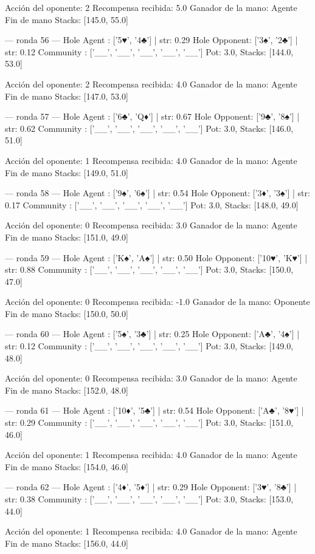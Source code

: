 Acción del oponente: 2
Recompensa recibida: 5.0
Ganador de la mano: Agente
Fin de mano Stacks: [145.0, 55.0]


--- ronda 56 ---
Hole Agent : ['5♥', '4♣'] | str: 0.29
Hole Opponent: ['3♠', '2♣'] | str: 0.12
Community  : ['__', '__', '__', '__', '__']
Pot: 3.0, Stacks: [144.0, 53.0]

Acción del oponente: 2
Recompensa recibida: 4.0
Ganador de la mano: Agente
Fin de mano Stacks: [147.0, 53.0]


--- ronda 57 ---
Hole Agent : ['6♣', 'Q♦'] | str: 0.67
Hole Opponent: ['9♣', '8♠'] | str: 0.62
Community  : ['__', '__', '__', '__', '__']
Pot: 3.0, Stacks: [146.0, 51.0]

Acción del oponente: 1
Recompensa recibida: 4.0
Ganador de la mano: Agente
Fin de mano Stacks: [149.0, 51.0]


--- ronda 58 ---
Hole Agent : ['9♠', '6♠'] | str: 0.54
Hole Opponent: ['3♦', '3♠'] | str: 0.17
Community  : ['__', '__', '__', '__', '__']
Pot: 3.0, Stacks: [148.0, 49.0]

Acción del oponente: 0
Recompensa recibida: 3.0
Ganador de la mano: Agente
Fin de mano Stacks: [151.0, 49.0]


--- ronda 59 ---
Hole Agent : ['K♠', 'A♠'] | str: 0.50
Hole Opponent: ['10♥', 'K♥'] | str: 0.88
Community  : ['__', '__', '__', '__', '__']
Pot: 3.0, Stacks: [150.0, 47.0]

Acción del oponente: 0
Recompensa recibida: -1.0
Ganador de la mano: Oponente
Fin de mano Stacks: [150.0, 50.0]


--- ronda 60 ---
Hole Agent : ['5♠', '3♣'] | str: 0.25
Hole Opponent: ['A♣', '4♠'] | str: 0.12
Community  : ['__', '__', '__', '__', '__']
Pot: 3.0, Stacks: [149.0, 48.0]

Acción del oponente: 0
Recompensa recibida: 3.0
Ganador de la mano: Agente
Fin de mano Stacks: [152.0, 48.0]


--- ronda 61 ---
Hole Agent : ['10♦', '5♣'] | str: 0.54
Hole Opponent: ['A♣', '8♥'] | str: 0.29
Community  : ['__', '__', '__', '__', '__']
Pot: 3.0, Stacks: [151.0, 46.0]

Acción del oponente: 1
Recompensa recibida: 4.0
Ganador de la mano: Agente
Fin de mano Stacks: [154.0, 46.0]


--- ronda 62 ---
Hole Agent : ['4♦', '5♦'] | str: 0.29
Hole Opponent: ['3♥', '8♣'] | str: 0.38
Community  : ['__', '__', '__', '__', '__']
Pot: 3.0, Stacks: [153.0, 44.0]

Acción del oponente: 1
Recompensa recibida: 4.0
Ganador de la mano: Agente
Fin de mano Stacks: [156.0, 44.0]


